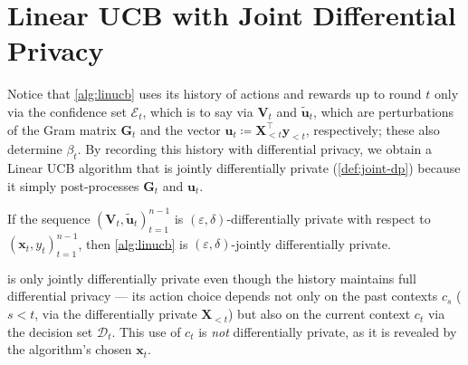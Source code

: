 \documentclass{article}
\renewcommand{\vec}[1]{\bm{#1}}
\newcommand{\defeq}{\coloneq}
\newcommand{\D}{\mathcal{D}}
\newcommand{\E}{\mathcal{E}}
\providecommand\transp{\top}
\let\transpsymbol\transp
\renewcommand{\transp}[1]{#1^\transpsymbol}
\begin{document}
\section{Linear UCB with Joint Differential Privacy}
\label{sec:alg-dp}

Notice that \cref{alg:linucb} uses its history of actions and rewards
up to round $t$ only via the confidence set $\E_t$, which is to say
via $\vec V_t$ and $\tilde{\vec u}_t$, which are perturbations of the Gram
matrix $\vec G_t$ and the vector
$\vec u_t \defeq \transp{\vec X_{<t}} \vec y_{<t}$, respectively;
these also determine $\beta_t$.  By recording this history with
differential privacy, we obtain a Linear UCB algorithm that is jointly
differentially private (\cref{def:joint-dp}) because it simply
post-processes $\vec G_t$ and $\vec u_t$.

\begin{claim}
  If the sequence $(\vec V_t,\tilde{\vec u}_t)_{t=1}^{n-1}$ is
  $(\varepsilon,\delta)$-differentially private with respect to
  $(\vec x_t, y_t)_{t=1}^{n-1}$, then \cref{alg:linucb} is
  $(\varepsilon,\delta)$-jointly differentially private.
\end{claim}

\begin{remark}
   is only jointly differentially private even though
  the history maintains full differential privacy --- its action
  choice depends not only on the past contexts $c_s$ ($s < t$, via the
  differentially private $\vec X_{<t}$) but also on the current
  context $c_t$ via the decision set $\D_t$.  This use of $c_t$
  is \emph{not} differentially private, as it is revealed by the algorithm's
  chosen $\vec x_t$.
\end{remark}
\end{document}
